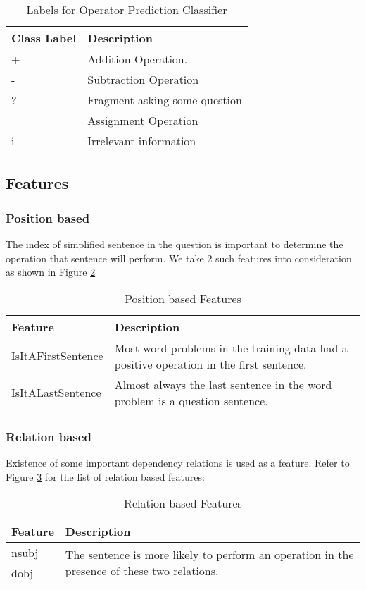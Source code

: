 \documentclass[11pt]{article}
\begin{document}
\begin{table}[h!]
\centering
\begin{tabular}{ | m{2cm} | m{5cm} |}
\hline
\textbf{Class Label} & \textbf{Description}\\ \hline
+ & Addition Operation.\\ \hline
- & Subtraction Operation\\ \hline
? & Fragment asking some question\\ \hline
= & Assignment Operation\\ \hline
i & Irrelevant information \\ \hline
\end{tabular}
\caption{Labels for Operator Prediction Classifier}
\label{figure:7}
\end{table}

\subsection{Features}
\subsubsection{Position based}
The index of simplified sentence in the question is important to determine the operation that sentence will perform. We take 2 such features into consideration as shown in Figure \ref{figure:8}
\begin{table}[h!]
\centering
\begin{tabular}{ | m{3cm} | m{4cm} |}
\hline
\textbf{Feature} & \textbf{Description}\\ \hline
IsItAFirstSentence & Most word problems in the training data had a positive operation in the first sentence.\\ \hline
IsItALastSentence & Almost always the last sentence in the word problem is a question sentence.\\ \hline
\end{tabular}
\caption{Position based Features}
\label{figure:8}
\end{table}

\subsubsection{Relation based}
Existence of some important dependency relations is used as a feature. Refer to Figure \ref{figure:9} for the list of relation based features:
\begin{table}[H]
\begin{tabular}{|m{2cm} | m{5cm}|}
\hline 
\textbf{Feature} & \textbf{Description}\\ \hline
nsubj & \multirow{2}{5cm}{\centering The sentence is more likely to perform an operation in the presence of these two relations.} \\[10pt]
\cline{1-1} 
 dobj & \\[10pt]
\hline
\end{tabular}
\caption{Relation based Features}
\label{figure:9}
\end{table}
\end{document}
